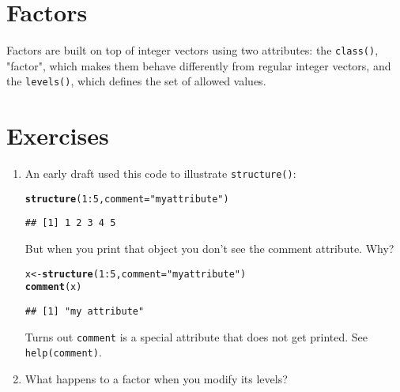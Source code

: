 \documentclass{article}\usepackage[]{graphicx}\usepackage[]{color}
\makeatletter
\newcommand{\hlnum}[1]{\textcolor[rgb]{0.686,0.059,0.569}{#1}}%
\newcommand{\hlstr}[1]{\textcolor[rgb]{0.192,0.494,0.8}{#1}}%
\newcommand{\hlopt}[1]{\textcolor[rgb]{0,0,0}{#1}}%
\newcommand{\hlstd}[1]{\textcolor[rgb]{0.345,0.345,0.345}{#1}}%
\newcommand{\hlkwb}[1]{\textcolor[rgb]{0.69,0.353,0.396}{#1}}%
\newcommand{\hlkwc}[1]{\textcolor[rgb]{0.333,0.667,0.333}{#1}}%
\newcommand{\hlkwd}[1]{\textcolor[rgb]{0.737,0.353,0.396}{\textbf{#1}}}%
\newenvironment{kframe}{%
 \def\at@end@of@kframe{}%
 \ifinner\ifhmode%
  \def\at@end@of@kframe{\end{minipage}}%
  \begin{minipage}{\columnwidth}%
 \fi\fi%
 \def\FrameCommand##1{\hskip\@totalleftmargin \hskip-\fboxsep
 \colorbox{shadecolor}{##1}\hskip-\fboxsep
     \hskip-\linewidth \hskip-\@totalleftmargin \hskip\columnwidth}%
 \MakeFramed {\advance\hsize-\width
   \@totalleftmargin\z@ \linewidth\hsize
   \@setminipage}}%
 {\par\unskip\endMakeFramed%
 \at@end@of@kframe}
\newenvironment{knitrout}{}{} %
\makeatother
\begin{document}
\section{Factors}

Factors are built on top of integer vectors using two attributes: the \verb`class()`, "factor", which makes them behave differently from regular integer vectors, and the \verb`levels()`, which defines the set of allowed values.

\section{Exercises}

\begin{enumerate}
\item An early draft used this code to illustrate \verb`structure()`:

\begin{knitrout}
\color{fgcolor}\begin{kframe}
\begin{alltt}
\hlkwd{structure}\hlstd{(}\hlnum{1}\hlopt{:}\hlnum{5}\hlstd{,} \hlkwc{comment} \hlstd{=} \hlstr{"my attribute"}\hlstd{)}
\end{alltt}
\begin{verbatim}
## [1] 1 2 3 4 5
\end{verbatim}
\end{kframe}
\end{knitrout}

But when you print that object you don't see the comment attribute. Why?
\begin{knitrout}
\color{fgcolor}\begin{kframe}
\begin{alltt}
\hlstd{x} \hlkwb{<-} \hlkwd{structure}\hlstd{(}\hlnum{1}\hlopt{:}\hlnum{5}\hlstd{,} \hlkwc{comment}\hlstd{=}\hlstr{"my attribute"}\hlstd{)}
\hlkwd{comment}\hlstd{(x)}
\end{alltt}
\begin{verbatim}
## [1] "my attribute"
\end{verbatim}
\end{kframe}
\end{knitrout}

Turns out \verb`comment` is a special attribute that does not get printed. See \verb`help(comment)`.

\item What happens to a factor when you modify its levels?


\end{enumerate}
\end{document}
